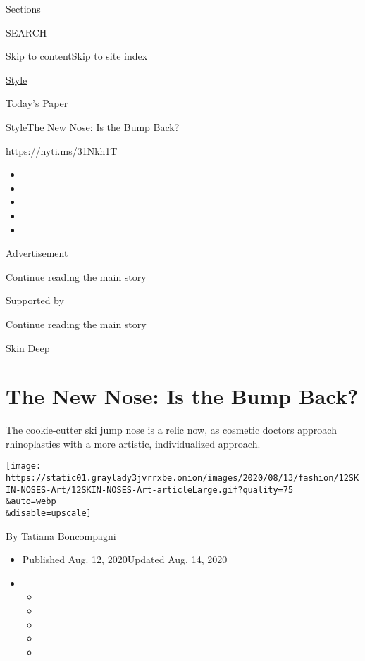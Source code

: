 Sections

SEARCH

\protect\hyperlink{site-content}{Skip to
content}\protect\hyperlink{site-index}{Skip to site index}

\href{https://www.nytimes3xbfgragh.onion/section/style}{Style}

\href{https://myaccount.nytimes3xbfgragh.onion/auth/login?response_type=cookie\&client_id=vi}{}

\href{https://www.nytimes3xbfgragh.onion/section/todayspaper}{Today's
Paper}

\href{/section/style}{Style}\textbar{}The New Nose: Is the Bump Back?

\url{https://nyti.ms/31Nkh1T}

\begin{itemize}
\item
\item
\item
\item
\item
\end{itemize}

Advertisement

\protect\hyperlink{after-top}{Continue reading the main story}

Supported by

\protect\hyperlink{after-sponsor}{Continue reading the main story}

Skin Deep

\hypertarget{the-new-nose-is-the-bump-back}{%
\section{The New Nose: Is the Bump
Back?}\label{the-new-nose-is-the-bump-back}}

The cookie-cutter ski jump nose is a relic now, as cosmetic doctors
approach rhinoplasties with a more artistic, individualized approach.

\texttt{[image: https://static01.graylady3jvrrxbe.onion/images/2020/08/13/fashion/12SKIN-NOSES-Art/12SKIN-NOSES-Art-articleLarge.gif?quality=75\\\&auto=webp\\\&disable=upscale]}

By Tatiana Boncompagni

\begin{itemize}
\item
  Published Aug. 12, 2020Updated Aug. 14, 2020
\item
  \begin{itemize}
  \item
  \item
  \item
  \item
  \item
  \end{itemize}
\end{itemize}

